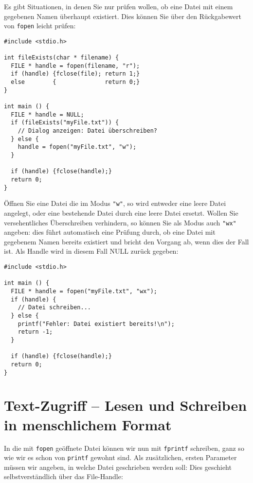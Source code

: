 \begin{hintbox}
Es gibt Situationen, in denen Sie nur prüfen wollen, ob eine Datei mit einem gegebenen Namen überhaupt existiert. Dies können Sie über den Rückgabewert von \texttt{fopen} leicht prüfen:

\begin{codebox}
\begin{verbatim}
#include <stdio.h>

int fileExists(char * filename) {
  FILE * handle = fopen(filename, "r");
  if (handle) {fclose(file); return 1;}
  else        {              return 0;}
}

int main () {
  FILE * handle = NULL;
  if (fileExists("myFile.txt")) {
    // Dialog anzeigen: Datei überschreiben?
  } else {
    handle = fopen("myFile.txt", "w");
  }

  if (handle) {fclose(handle);}
  return 0;
}
\end{verbatim}
\end{codebox}
\end{hintbox}

\begin{hintbox}
Öffnen Sie eine Datei die im Modus \texttt{"w"}, so wird entweder eine leere Datei angelegt, oder eine bestehende Datei durch eine leere Datei ersetzt. Wollen Sie versehentliches Überschreiben verhindern, so können Sie als Modus auch \texttt{"wx"} angeben: dies führt automatisch eine Prüfung durch, ob eine Datei mit gegebenem Namen bereits existiert und bricht den Vorgang ab, wenn dies der Fall ist. Als Handle wird in diesem Fall NULL zurück gegeben:

\begin{codebox}
\begin{verbatim}
#include <stdio.h>

int main () {
  FILE * handle = fopen("myFile.txt", "wx");
  if (handle) {
    // Datei schreiben...
  } else {
    printf("Fehler: Datei existiert bereits!\n");
    return -1;
  }

  if (handle) {fclose(handle);}
  return 0;
}
\end{verbatim}
\end{codebox}
\end{hintbox}

\section{Text-Zugriff -- Lesen und Schreiben in menschlichem Format} \label{sec:humanAccess}
In die mit \texttt{fopen} geöffnete Datei können wir nun mit \texttt{fprintf} schreiben, ganz so wie wir es schon von \texttt{printf} gewohnt sind. Als zusätzlichen, ersten Parameter müssen wir angeben, in welche Datei geschrieben werden soll: Dies geschieht selbstverständlich über das File-Handle:


